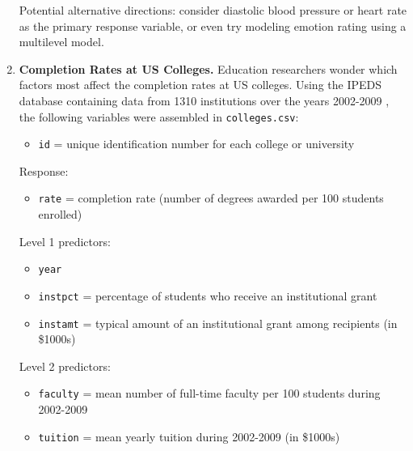 \documentclass[
]{krantz}
\providecommand{\tightlist}{%
  \setlength{\itemsep}{0pt}\setlength{\parskip}{0pt}}
\begin{document}
\begin{enumerate}
  Potential alternative directions: consider diastolic blood pressure or heart rate as the primary response variable, or even try modeling emotion rating using a multilevel model.
\item
  \textbf{Completion Rates at US Colleges.} Education researchers wonder which factors most affect the completion rates at US colleges. Using the IPEDS database containing data from 1310 institutions over the years 2002-2009 \citep{IPEDS}, the following variables were assembled in \texttt{colleges.csv}:

  \begin{itemize}
  \tightlist
  \item
    \texttt{id} = unique identification number for each college or university
  \end{itemize}

  Response:

  \begin{itemize}
  \tightlist
  \item
    \texttt{rate} = completion rate (number of degrees awarded per 100 students enrolled)
  \end{itemize}

  Level 1 predictors:

  \begin{itemize}
  \tightlist
  \item
    \texttt{year}
  \item
    \texttt{instpct} = percentage of students who receive an institutional grant
  \item
    \texttt{instamt} = typical amount of an institutional grant among recipients (in \$1000s)
  \end{itemize}

  Level 2 predictors:

  \begin{itemize}
  \tightlist
  \item
    \texttt{faculty} = mean number of full-time faculty per 100 students during 2002-2009
  \item
    \texttt{tuition} = mean yearly tuition during 2002-2009 (in \$1000s)
  \end{itemize}


\end{enumerate}
\end{document}
